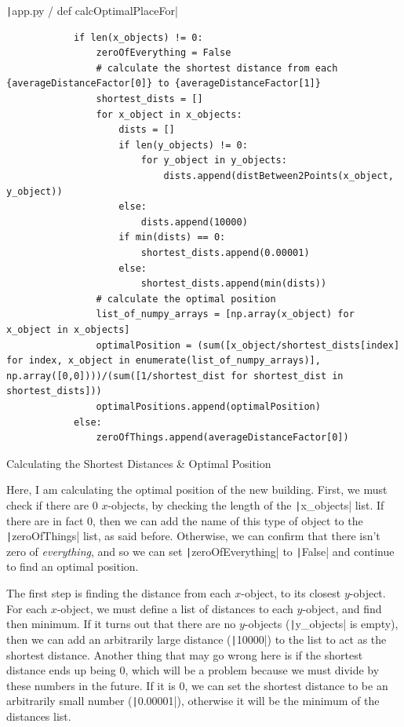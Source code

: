 \documentclass[12pt]{report}
\newcommand{\pil}[1]{\protect\texttt|#1|}
\begin{document}
\begin{listing}[H]
\pil{app.py / def calcOptimalPlaceFor}
\begin{verbatim}
            if len(x_objects) != 0:
                zeroOfEverything = False
                # calculate the shortest distance from each {averageDistanceFactor[0]} to {averageDistanceFactor[1]}
                shortest_dists = []
                for x_object in x_objects:
                    dists = []
                    if len(y_objects) != 0:
                        for y_object in y_objects:
                            dists.append(distBetween2Points(x_object, y_object))
                    else:
                        dists.append(10000)
                    if min(dists) == 0:
                        shortest_dists.append(0.00001)
                    else:
                        shortest_dists.append(min(dists))
                # calculate the optimal position
                list_of_numpy_arrays = [np.array(x_object) for x_object in x_objects]
                optimalPosition = (sum([x_object/shortest_dists[index] for index, x_object in enumerate(list_of_numpy_arrays)], np.array([0,0])))/(sum([1/shortest_dist for shortest_dist in shortest_dists]))
                optimalPositions.append(optimalPosition)
            else:
                zeroOfThings.append(averageDistanceFactor[0])
\end{verbatim}
\caption{Calculating the Shortest Distances \& Optimal Position}\label{cs:calcShortestDistances}
\end{listing}

Here, I am calculating the optimal position of the new building. First, we must check if there are 0 $x$-objects, by checking the length of the \pil{x_objects} list. If there are in fact 0, then we can add the name of this type of object to the \pil{zeroOfThings} list, as said before. Otherwise, we can confirm that there isn't zero of \textit{everything}, and so we can set \pil{zeroOfEverything} to \pil{False} and continue to find an optimal position.

The first step is finding the distance from each $x$-object, to its closest $y$-object. For each $x$-object, we must define a list of distances to each $y$-object, and find then minimum. If it turns out that there are no $y$-objects (\pil{y_objects} is empty), then we can add an arbitrarily large distance (\pil{10000}) to the list to act as the shortest distance. Another thing that may go wrong here is if the shortest distance ends up being 0, which will be a problem because we must divide by these numbers in the future. If it is 0, we can set the shortest distance to be an arbitrarily small number (\pil{0.00001}), otherwise it will be the minimum of the distances list.
\end{document}
